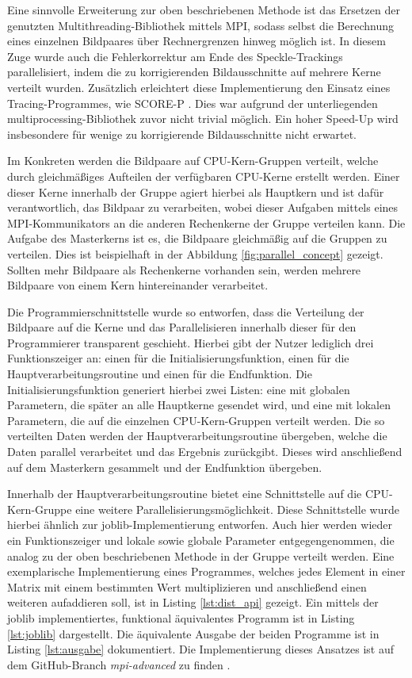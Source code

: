 Eine sinnvolle Erweiterung zur oben beschriebenen Methode ist das Ersetzen der genutzten Mul\-ti\-threa\-ding-Bibliothek mittels MPI, sodass selbst die Berechnung eines einzelnen Bildpaares über Rechnergrenzen hinweg möglich ist. In diesem Zuge wurde auch die Fehlerkorrektur am Ende des Speckle-Trackings parallelisiert, indem die zu korrigierenden Bildausschnitte auf mehrere Kerne verteilt wurden. Zusätzlich erleichtert diese Implementierung den Einsatz eines Tracing-Programmes, wie SCORE-P \cite{KRM+12}. Dies war aufgrund der unterliegenden multiprocessing-Bibliothek zuvor nicht trivial möglich. Ein hoher Speed-Up wird insbesondere für wenige zu korrigierende Bildausschnitte nicht erwartet. 

Im Konkreten werden die Bildpaare auf \gls{CPU}-Kern-Gruppen verteilt, welche durch gleichmäßiges Aufteilen der verfügbaren \gls{CPU}-Kerne erstellt werden. Einer dieser Kerne innerhalb der Gruppe agiert hierbei als Hauptkern und ist dafür verantwortlich, das Bildpaar zu verarbeiten, wobei dieser Aufgaben mittels eines \gls{MPI}-Kommunikators an die anderen Rechenkerne der Gruppe verteilen kann. Die Aufgabe des Masterkerns ist es, die Bildpaare gleichmäßig auf die Gruppen zu verteilen. Dies ist beispielhaft in der Abbildung \ref{fig:parallel_concept} gezeigt. Sollten mehr Bildpaare als Rechenkerne vorhanden sein, werden mehrere Bildpaare von einem Kern hintereinander verarbeitet. 

Die Programmierschnittstelle wurde so entworfen, dass die Verteilung der Bildpaare auf die Kerne und das Parallelisieren innerhalb dieser für den Programmierer transparent geschieht. Hierbei gibt der Nutzer lediglich drei Funktionszeiger an: einen für die Initialisierungsfunktion, einen für die Hauptverarbeitungsroutine und einen für die Endfunktion. Die Initialisierungsfunktion generiert hierbei zwei Listen: eine mit globalen Parametern, die später an alle Hauptkerne gesendet wird, und eine mit lokalen Parametern, die auf die einzelnen \gls{CPU}-Kern-Gruppen verteilt werden. Die so verteilten Daten werden der Hauptverarbeitungsroutine übergeben, welche die Daten parallel verarbeitet und das Ergebnis zurückgibt. Dieses wird anschließend auf dem Masterkern gesammelt und der Endfunktion übergeben. 

Innerhalb der Hauptverarbeitungsroutine bietet eine Schnittstelle auf die \gls{CPU}-Kern-Gruppe eine weitere Parallelisierungsmöglichkeit. Diese Schnittstelle wurde hierbei ähnlich zur joblib-Implementierung entworfen. Auch hier werden wieder ein Funktionszeiger und lokale sowie globale Parameter entgegengenommen, die analog zu der oben beschriebenen Methode in der Gruppe verteilt werden. Eine exemplarische Implementierung eines Programmes, welches jedes Element in einer Matrix mit einem bestimmten Wert multiplizieren und anschließend einen weiteren aufaddieren soll, ist in Listing \ref{lst:dist_api} gezeigt. Ein mittels der joblib implementiertes, funktional äquivalentes Programm ist in Listing \ref{lst:joblib} dargestellt. Die äquivalente Ausgabe der beiden Programme ist in Listing \ref{lst:ausgabe} dokumentiert. Die Implementierung dieses Ansatzes ist auf dem GitHub-Branch \textit{mpi-advanced} zu finden \cite{CBS18}.

